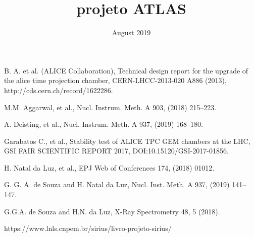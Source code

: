 \documentclass{report}
\title{projeto ATLAS}
\date{August 2019}
\begin{document}

%



\tableofcontents







%


\begin{thebibliography}{9}
 B. A. et al. (ALICE Collaboration), Technical design report for the upgrade of the alice time projection chamber, CERN-LHCC-2013-020 A886 (2013), http://cds.cern.ch/record/1622286.


 M.M. Aggarwal, et al., Nucl. Instrum. Meth. A 903, (2018) 215–223. 

 A. Deisting, et al., Nucl. Instrum. Meth. A 937, (2019) 168–180.


 Garabatos C., et al., Stability test of ALICE TPC GEM chambers at the LHC, GSI FAIR SCIENTIFIC REPORT 2017, DOI:10.15120/GSI-2017-01856.


 H. Natal da Luz, et al., EPJ Web of Conferences 174, (2018) 01012.



 G. G. A. de Souza and  H. Natal da Luz, Nucl. Inst. Meth. A 937, (2019) 141–147.

 G.G.A. de Souza and H.N. da Luz, X-Ray Spectrometry 48, 5 (2018).

 https://www.lnls.cnpem.br/sirius/livro-projeto-sirius/

\end{thebibliography}
\newpage
\end{document}
